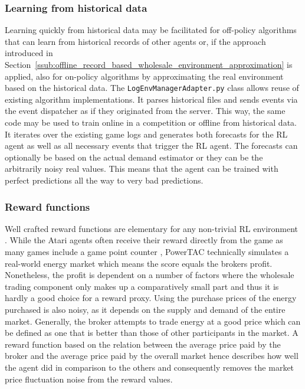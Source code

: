 \subsubsection{Learning from historical data}%
\label{sub:learning_from_historical_data}

Learning quickly from historical data may be facilitated for off-policy algorithms that can learn from historical
records of other agents or, if the approach introduced in
Section~\ref{ssub:offline_record_based_wholesale_environment_approximation} is applied, also for on-policy algorithms by
approximating the real environment based on the historical data.
The \texttt{LogEnvManagerAdapter.py} class allows reuse of existing algorithm implementations. It
parses historical files and sends events via the event dispatcher as if they originated from the server. This way, the
same code may be used to train online in a competition or offline from historical data. It iterates over the existing
game logs and generates both forecasts for the \ac{RL} agent as well as all necessary events that trigger the \ac{RL}
agent. The forecasts can optionally be based on the actual demand estimator or they can be the arbitrarily noisy real
values. This means that the agent can be trained with perfect predictions all the way to very bad predictions.

\subsubsection{Reward functions}%
\label{sub:reward_functions}

Well crafted reward functions are elementary for any non-trivial \ac{RL}
environment \cite[p.469ff.]{amodei2016concrete, sutton2018reinforcement}. While the Atari agents often receive their reward directly from the
game as many games include a game point counter \citep{mnih2013playing}, \ac{PowerTAC} technically simulates a
real-world energy market which means the score equals the brokers profit. Nonetheless, the profit is dependent on a number of
factors where the wholesale trading component only makes up a comparatively small part and thus it is hardly a
good choice for a reward proxy. Using the purchase prices of the energy purchased is also noisy, as it depends on the
supply and demand of the entire market. Generally, the broker attempts to trade energy at a good price which can be
defined as one that is better than those of other participants in the market. A reward function based on the relation
between the average price paid by the broker and the average price paid by the overall market hence describes
how well the agent did in comparison to the others and consequently removes the market price fluctuation noise from the
reward values.

